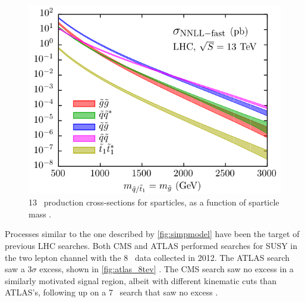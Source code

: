 \begin{centering}
\begin{figure}[!hbt]
\myfloatalign
\includegraphics[width=.9\linewidth]{figures/theory/nnllfast_wpresc_total.pdf}
\caption{ 13 \tev~production cross-sections for sparticles, as a function of sparticle mass \cite{1607.07741}.}
\label{fig:gluino_xs}
\end{figure}
\end{centering}


Processes similar to the one described by \autoref{fig:simpmodel} have been the target of previous \ac{LHC} searches. Both \ac{CMS} and \ac{ATLAS} performed searches for \ac{SUSY} in the two lepton channel with the 8 \tev~data collected in 2012. The \ac{ATLAS} search saw a 3$\sigma$ excess, shown in \autoref{fig:atlas_8tev} \cite{SUSY-2014-10}. The \ac{CMS} search saw no excess in a similarly motivated signal region, albeit with different kinematic cuts than \ac{ATLAS}'s, following up on a 7 \tev~search that saw no excess \cite{Chatrchyan:2012qka, CMS2}. 

